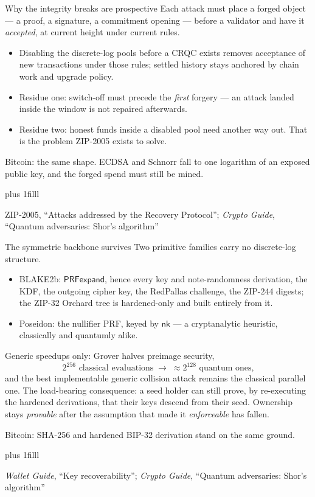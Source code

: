 \documentclass[aspectratio=169,11pt]{beamer}
\newcommand{\nksym}{\ensuremath{\mathsf{nk}}}
\newcommand{\src}[1]{\par\vskip0pt plus 1filll
  {\fontsize{6}{7.2}\selectfont\color{arbdim}\raggedright #1\par}}
\begin{document}
\begin{frame}{Why the integrity breaks are prospective}
Each attack must place a forged object --- a proof, a signature, a
commitment opening --- before a validator and have it \emph{accepted},
at current height under current rules.
\begin{itemize}
  \item Disabling the discrete-log pools before a CRQC exists removes
    acceptance of new transactions under those rules; settled history
    stays anchored by chain work and upgrade policy.
  \item Residue one: switch-off must precede the \emph{first} forgery ---
    an attack landed inside the window is not repaired afterwards.
  \item Residue two: honest funds inside a disabled pool need another way
    out. That is the problem ZIP-2005 exists to solve.
\end{itemize}
\alert{Bitcoin:} the same shape. ECDSA and Schnorr fall to one logarithm
of an exposed public key, and the forged spend must still be mined.
\src{ZIP-2005, ``Attacks addressed by the Recovery Protocol''; \emph{Crypto
Guide}, ``Quantum adversaries: Shor's algorithm''}
\end{frame}

\begin{frame}{The symmetric backbone survives}
Two primitive families carry no discrete-log structure.
\begin{itemize}
  \item BLAKE2b: $\mathsf{PRFexpand}$, hence every key and note-randomness
    derivation, the KDF, the outgoing cipher key, the RedPallas challenge,
    the ZIP-244 digests; the ZIP-32 Orchard tree is hardened-only and
    built entirely from it.
  \item Poseidon: the nullifier PRF, keyed by \nksym{} --- a
    cryptanalytic heuristic, classically and quantumly alike.
\end{itemize}
Generic speedups only: Grover halves preimage security,
\[
2^{256} \text{ classical evaluations} \;\longrightarrow\; \approx 2^{128}
\text{ quantum ones,}
\]
and the best implementable generic collision attack remains the
classical parallel one. The load-bearing consequence: a seed holder can
still prove, by re-executing the hardened derivations, that their keys
descend from their seed. Ownership stays \emph{provable} after the
assumption that made it \emph{enforceable} has fallen.

\alert{Bitcoin:} SHA-256 and hardened BIP-32 derivation stand on the same
ground.
\src{\emph{Wallet Guide}, ``Key recoverability'';
\emph{Crypto Guide}, ``Quantum adversaries: Shor's algorithm''}
\end{frame}
\end{document}
